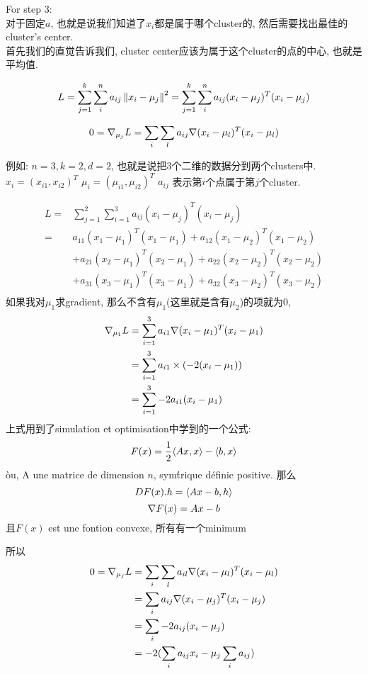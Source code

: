 \documentclass{article}
\begin{document}
For step 3:\\
对于固定$a$, 也就是说我们知道了$x_i$都是属于哪个cluster的, 然后需要找出最佳的cluster's center.\\
首先我们的直觉告诉我们, cluster center应该为属于这个cluster的点的中心, 也就是平均值.

$$
\begin{aligned}
\end{aligned}
L
= \sum_{j = 1}^k \sum_i^n a_{ij}\left\Vert x_i - \mu_j\right\Vert^2
= \sum_{j = 1}^k \sum_i^n a_{ij}(x_i - \mu_j)^T (x_i - \mu_j)
$$

$$
0 = \nabla _{\mu_j}{L} = \sum_i \sum_l a_{ij} \nabla (x_i - \mu_l)^T (x_i - \mu_l)
$$

例如: $n=3, k=2, d=2$, 也就是说把3个二维的数据分到两个clusters中.\\
$x_i = (x_{i1}, x_{i2})^T$
$\mu_i = (\mu_{i1}, \mu_{i2})^T$
$a_{ij}$ 表示第$i$个点属于第$j$个cluster.

$$
\begin{aligned}
L
= & \sum_{j = 1}^2 \sum_{i=1}^3 a_{ij}(x_i - \mu_j)^T (x_i - \mu_j) \\
= &  a_{11}(x_1 - \mu_1)^T (x_1 - \mu_1) + a_{12}(x_1 - \mu_2)^T (x_1 - \mu_2) \\
& + a_{21}(x_2 - \mu_1)^T (x_2 - \mu_1) + a_{22}(x_2 - \mu_2)^T (x_2 - \mu_2) \\
& + a_{31}(x_3 - \mu_1)^T (x_3 - \mu_1) + a_{32}(x_3 - \mu_2)^T (x_3 - \mu_2) \\
\end{aligned}
$$
如果我对$\mu_1$求gradient, 那么不含有$\mu_1$(这里就是含有$\mu_2$)的项就为0,
$$
\begin{aligned}
\nabla _{\mu_1}{L}
& = \sum_{i = 1}^3 a_{i1}\nabla (x_i - \mu_1)^T (x_i - \mu_1) \\
& = \sum_{i = 1}^3 a_{i1} \times (-2(x_i - \mu_1)) \\
& = \sum_{i = 1}^3  -2a_{i1}(x_i - \mu_1) \\
\end{aligned}
$$
上式用到了simulation et optimisation中学到的一个公式:
$$
F(x)= \frac{1}{2} \langle Ax , x\rangle - \langle b , x\rangle
$$
\`ou, A une matrice de dimension $n$, sym\'trique d\'efinie positive. 那么
$$DF(x).h = \langle Ax - b , h\rangle$$
$$\nabla F(x) = Ax - b$$
且$F(x)$ est une fontion convexe, 所有有一个minimum

所以
$$
\begin{aligned}
0 = \nabla _{\mu_j}{L}
&= \sum_i \sum_l a_{il} \nabla (x_i - \mu_l)^T (x_i - \mu_l) \\
&= \sum_i a_{ij} \nabla (x_i - \mu_j)^T (x_i - \mu_j) \\
&= \sum_i -2a_{ij} (x_i - \mu_j) \\
&= -2(\sum_i a_{ij}x_i - \mu_j \sum_i a_{ij})
\end{aligned}
$$
\end{document}
